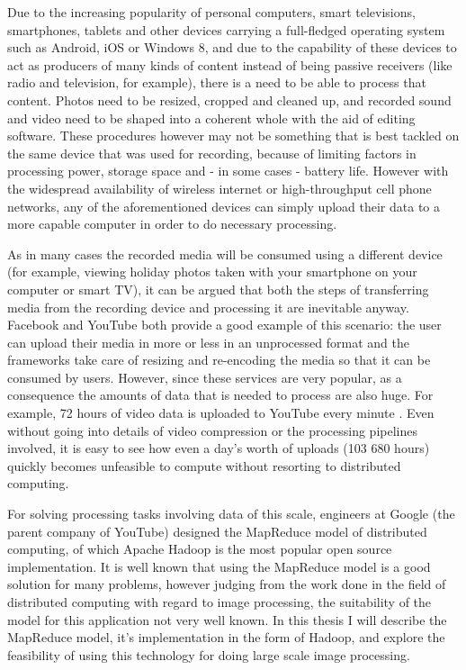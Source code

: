 \documentclass [12pt,a4paper]{report}
\begin{document}
Due to the increasing popularity of personal computers, smart televisions, smartphones, tablets and other devices carrying a full-fledged operating system such as Android, iOS or Windows 8, and due to the capability of these devices to act as producers of many kinds of content instead of being passive receivers (like radio and television, for example), there is a need to be able to process that content. Photos need to be resized, cropped and cleaned up, and recorded sound and video need to be shaped into a coherent whole with the aid of editing software. These procedures however may not be something that is best tackled on the same device that was used for recording, because of limiting factors in processing power, storage space and - in some cases - battery life. However with the widespread availability of wireless internet or high-throughput cell phone networks, any of the aforementioned devices can simply upload their data to a more capable computer in order to do necessary processing. 

As in many cases the recorded media will be consumed using a different device (for example, viewing holiday photos taken with your smartphone on your computer or smart TV), it can be argued that both the steps of transferring media from the recording device and processing it are inevitable anyway. Facebook and YouTube both provide a good example of this scenario: the user can upload their media in more or less in an unprocessed format and the frameworks take care of resizing and re-encoding the media so that it can be consumed by users. However, since these services are very popular, as a consequence the amounts of data that is needed to process are also huge. For example, 72 hours of video data is uploaded to YouTube every minute \cite{youtube_stats}. Even without going into details of video compression or the processing pipelines involved, it is easy to see how even a day's worth of uploads (103 680 hours) quickly becomes unfeasible to compute without resorting to distributed computing.

For solving processing tasks involving data of this scale, engineers at Google (the parent company of YouTube) designed the MapReduce model of distributed computing, of which Apache Hadoop is the most popular open source implementation. It is well known that using the MapReduce model is a good solution for many problems, however judging from the work done in the field of distributed computing with regard to image processing, the suitability of the model for this application not very well known. In this thesis I will describe the MapReduce model, it's implementation in the form of Hadoop, and explore the feasibility of using this technology for doing large scale image processing.
\end{document}
